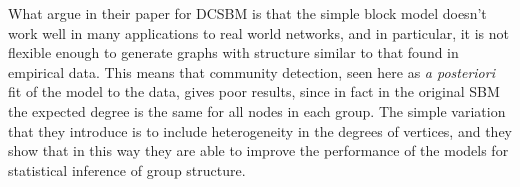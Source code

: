 What \textcite{karrer2011dcsbm} argue in their paper for DCSBM is that the simple block model doesn't work well in many applications to real world networks, and in particular, it is not flexible enough to generate graphs with structure similar to that found in empirical data. This means that community detection, seen here as \textit{a posteriori} fit of the model to the data, gives poor results, since in fact in the original SBM the expected degree is the same for all nodes in each group. The simple variation that they introduce is to include heterogeneity in the degrees of vertices, and they show that in this way they are able to improve the performance of the models for statistical inference of group structure.

